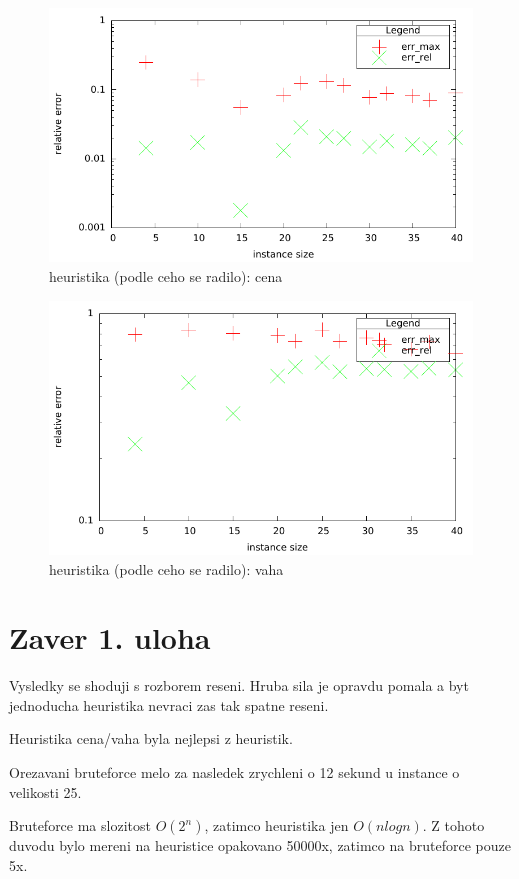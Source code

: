 \documentclass[12pt,a4paper]{article}
\begin{document}
\begin{figure}[H]
	\caption{heuristika (podle ceho se radilo): cena}
	\includegraphics{./err_h2.pdf}
\end{figure}

\begin{figure}[H]
	\caption{heuristika (podle ceho se radilo): vaha}
	\includegraphics{./err_h3.pdf}
\end{figure}


\section{Zaver 1. uloha}
Vysledky se shoduji s rozborem reseni. Hruba sila je opravdu pomala a byt jednoducha heuristika nevraci zas tak spatne reseni.

Heuristika cena/vaha byla nejlepsi z heuristik.

Orezavani bruteforce melo za nasledek zrychleni o 12 sekund u instance o velikosti 25.

Bruteforce ma slozitost $O(2^n)$, zatimco heuristika jen $O(nlogn)$. Z tohoto duvodu bylo mereni na heuristice opakovano 50000x, zatimco na bruteforce pouze 5x.
\end{document}

